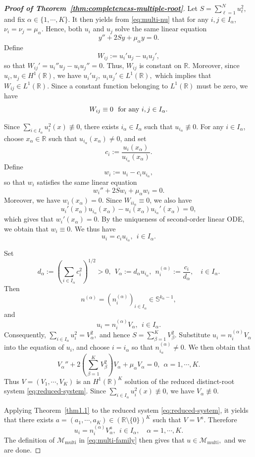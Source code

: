 \documentclass[11pt]{article}
\numberwithin{equation}{section}
\theoremstyle{definition}
\begin{document}
\begin{proof}[\normalfont\bfseries Proof of Theorem~\ref{thm:completeness-multiple-root}]
Let
\(
S=\sum_{\ell=1}^N u_\ell^2 ,
\)
and fix \(\alpha\in\{1,\cdots,K\}\). It then yields from \eqref{eq:multi-nu} that for any \(i,j\in I_\alpha\),
\(
\nu_i=\nu_j=\mu_\alpha .
\)
Hence, both \(u_i\) and \(u_j\) solve the same linear equation
\[
y''+2S y+\mu_\alpha y=0.
\]
Define
\[
W_{ij}:=u_i'u_j-u_i u_j',
\]
so that $W_{ij}'
=
u_i''u_j-u_i u_j''
=0$.
Thus, \(W_{ij}\) is constant on \(\mathbb R\). Moreover, since
\(u_i,u_j\in H^1(\mathbb R)\), we have
$
u_i'u_j,\ u_i u_j'\in L^1(\mathbb R),
$
which implies that \(W_{ij}\in L^1(\mathbb R)\). Since a constant function belonging to
\(L^1(\mathbb R)\) must be zero, we have
\[
W_{ij}\equiv0\ \ \hbox{for any }i,j\in I_\alpha.
\]


Since $\sum_{i\in I_\alpha} u_i^2(x)\not\equiv 0$, there exists
\(i_\alpha\in I_\alpha\) such that
$u_{i_\alpha}\not\equiv0$.
For any \(i\in I_\alpha\), choose \(x_\alpha\in\mathbb R\) such that
\(u_{i_\alpha}(x_\alpha)\neq0\), and set
\[
c_i:=\frac{u_i(x_\alpha)}{u_{i_\alpha}(x_\alpha)} .
\]
Define
\[
w_i:=u_i-c_i u_{i_\alpha},
\]
so that \(w_i\) satisfies the same linear equation
\[
w_i''+2S w_i+\mu_\alpha w_i=0 .
\]
Moreover, we have $w_i(x_\alpha)=0$.
Since \(W_{i i_\alpha}\equiv0\), we also have
\[
u_i'(x_\alpha)u_{i_\alpha}(x_\alpha)
-
u_i(x_\alpha)u_{i_\alpha}'(x_\alpha)=0,
\]
which gives that $w_i'(x_\alpha)=0$.
By the uniqueness of   second-order linear ODE, we obtain that
\(
w_i\equiv0.
\)
We thus have
\[
u_i=c_i u_{i_\alpha},
\ \  i\in I_\alpha .
\]



Set
\[
d_\alpha:=\left(\sum_{i\in I_\alpha}c_i^2\right)^{1/2}>0,
\ \
V_\alpha:=d_\alpha u_{i_\alpha},
\ \
n_i^{(\alpha)}:=\frac{c_i}{d_\alpha},
\quad i\in I_\alpha .
\]
Then
\[
n^{(\alpha)}
=
(n_i^{(\alpha)})_{i\in I_\alpha}
\in \mathbb S^{k_\alpha-1},
\]
and
\[
u_i=n_i^{(\alpha)}V_\alpha,
\ \  i\in I_\alpha .
\]
Consequently,
$
\sum_{i\in I_\alpha}u_i^2=V_\alpha^2,
$
and hence
$
S=\sum_{\beta=1}^K V_\beta^2.
$
Substitute $u_i=n_i^{(\alpha)}V_\alpha$
into the equation of \(u_i\), and choose \(i=i_\alpha\) so that
\(n_{i_\alpha}^{(\alpha)}\neq0\). We then obtain that
\[
V_\alpha''
+
2\left(\sum_{\beta=1}^K V_\beta^2\right)V_\alpha
+
\mu_\alpha V_\alpha
=0,
\ \  \alpha=1,\cdots,K.
\]
Thus
$
V=(V_1,\cdots,V_K)
$
is an \(H^1(\mathbb R)^K\) solution of the reduced distinct-root system
\eqref{eq:reduced-system}. Since $\sum_{i\in I_\alpha} u_i^2(x)\not\equiv 0$, we have
\(V_\alpha\not\equiv0\).


Applying Theorem~\ref{thm1.1} to the reduced system
\eqref{eq:reduced-system}, it yields that there exists
$
a=(a_1,\cdots,a_K)\in(\mathbb R\setminus\{0\})^K
$
such that
$
V=V^a .
$
Therefore
\[
u_i=n_i^{(\alpha)}V_\alpha^a,
\ \  i\in I_\alpha,\quad \alpha=1,\cdots,K.
\]
The definition of \(\mathcal M_{\mathrm{multi}}\) in
\eqref{eq:multi-family} then gives that
$
u\in \mathcal M_{\mathrm{multi}},
$
and we are done.
\end{proof}
\end{document}
